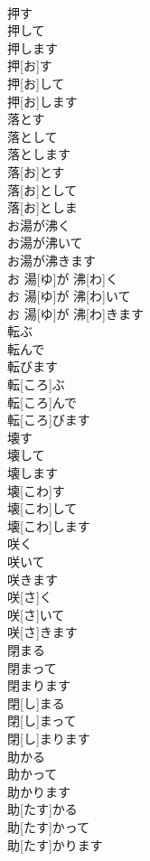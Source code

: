 \documentclass[8pt]{extreport}
\begin{document}
\begin{CJK}{UTF8}{min}
\\	押す 
\\	押して 
\\	押します	
\\	押[お]す 
\\	押[お]して 
\\	押[お]します	
\\	落とす 
\\	落として 
\\	落とします	
\\	落[お]とす 
\\	落[お]として 
\\	落[お]としま	
\\	お湯が沸く 
\\	お湯が沸いて 
\\	お湯が沸きます	
\\	お 湯[ゆ]が 沸[わ]く 
\\	お 湯[ゆ]が 沸[わ]いて 
\\	お 湯[ゆ]が 沸[わ]きます	
\\	転ぶ 
\\	転んで 
\\	転びます	
\\	転[ころ]ぶ 
\\	転[ころ]んで 
\\	転[ころ]びます	
\\	壊す 
\\	壊して 
\\	壊します	
\\	壊[こわ]す 
\\	壊[こわ]して 
\\	壊[こわ]します	
\\	咲く 
\\	咲いて 
\\	咲きます	
\\	咲[さ]く 
\\	咲[さ]いて 
\\	咲[さ]きます	
\\	閉まる 
\\	閉まって 
\\	閉まります	
\\	閉[し]まる 
\\	閉[し]まって 
\\	閉[し]まります	
\\	助かる 
\\	助かって 
\\	助かります	
\\	助[たす]かる 
\\	助[たす]かって 
\\	助[たす]かります	

\end{CJK}
\end{document}

